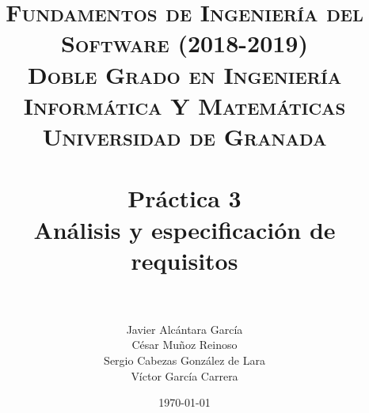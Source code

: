 


\graphicspath{{images/}}


\title{	
\normalfont \normalsize 
\textsc{\textbf{Fundamentos de Ingeniería del Software (2018-2019)} \\ Doble Grado en Ingeniería Informática Y Matemáticas \\ Universidad de Granada} \\ [25pt] %
\horrule{0.5pt} \\[0.4cm] %
\huge \textbf{Práctica 3} \\ Análisis y especificación de requisitos \\ %
\horrule{2pt} \\[0.5cm] %
}

\author{Javier Alcántara García\\ César Muñoz Reinoso \\ Sergio Cabezas González de Lara \\ Víctor García Carrera} %

\date{\normalsize\today} %





\maketitle %

\newpage %

\tableofcontents %

\newpage

